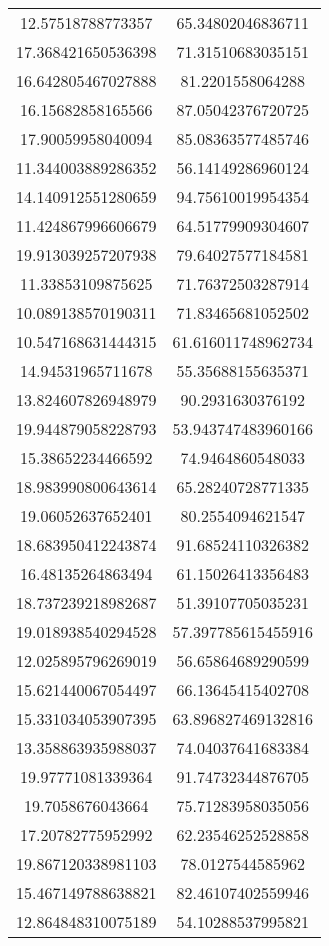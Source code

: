 \begin{table}
\begin{tabular}{cc}
12.57518788773357 & 65.34802046836711 \\
17.368421650536398 & 71.31510683035151 \\
16.642805467027888 & 81.2201558064288 \\
16.15682858165566 & 87.05042376720725 \\
17.90059958040094 & 85.08363577485746 \\
11.344003889286352 & 56.14149286960124 \\
14.140912551280659 & 94.75610019954354 \\
11.424867996606679 & 64.51779909304607 \\
19.913039257207938 & 79.64027577184581 \\
11.33853109875625 & 71.76372503287914 \\
10.089138570190311 & 71.83465681052502 \\
10.547168631444315 & 61.616011748962734 \\
14.94531965711678 & 55.35688155635371 \\
13.824607826948979 & 90.2931630376192 \\
19.944879058228793 & 53.943747483960166 \\
15.38652234466592 & 74.9464860548033 \\
18.983990800643614 & 65.28240728771335 \\
19.06052637652401 & 80.2554094621547 \\
18.683950412243874 & 91.68524110326382 \\
16.48135264863494 & 61.15026413356483 \\
18.737239218982687 & 51.39107705035231 \\
19.018938540294528 & 57.397785615455916 \\
12.025895796269019 & 56.65864689290599 \\
15.621440067054497 & 66.13645415402708 \\
15.331034053907395 & 63.896827469132816 \\
13.358863935988037 & 74.04037641683384 \\
19.97771081339364 & 91.74732344876705 \\
19.7058676043664 & 75.71283958035056 \\
17.20782775952992 & 62.23546252528858 \\
19.867120338981103 & 78.0127544585962 \\
15.467149788638821 & 82.46107402559946 \\
12.864848310075189 & 54.10288537995821 \\

\end{tabular}
\end{table}
